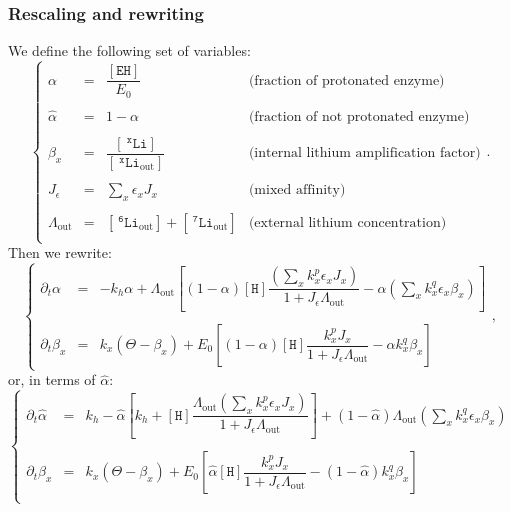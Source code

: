 \documentclass[aps,onecolumn,11pt]{revtex4}
\newcommand{\mychem}[1]{\mathtt{#1}}
\newcommand{\myconc}[1]{\left\lbrack{#1}\right\rbrack}
\newcommand{\spLi}[1]{{~^{\mychem{#1}}\mychem{Li}}}
\newcommand{\Li}[1]{\myconc{\spLi{#1}}}
\newcommand{\spLiOut}[1]{{\spLi{#1}}_{\mathrm{out}}}
\newcommand{\LiOut}[1]{\myconc{\spLiOut{#1}}}
\newcommand{\spEHin}{\mychem{EH}}
\newcommand{\EHin}{\myconc{\spEHin}}
\newcommand{\spproton}{\mychem{H}}
\newcommand{\proton}{\myconc{\spproton}}
\newcommand{\LiAll}{\Lambda}
\newcommand{\LiAllOut}{{\LiAll}_{\mathrm{out}}}
\begin{document}
\subsubsection{Rescaling and rewriting}
We define the following set of variables:
\begin{equation}
\label{eq:scale}
\left\lbrace
\begin{array}{rcll}
	\alpha & = & \dfrac{\EHin}{E_0} & \text{(fraction of protonated enzyme)}\\
	\\
	\hat\alpha & = & 1-\alpha       & \text{(fraction of not protonated enzyme)}\\
	\\
	\beta_x    & = & \dfrac{\Li{x}}{\LiOut{x}} & \text{(internal lithium amplification factor)}\\
	\\
	J_\epsilon & = & \sum_x \epsilon_x J_x & \text{(mixed affinity)}\\
	\\
	\LiAllOut  & = & \LiOut{6} + \LiOut{7} & \text{(external lithium concentration)}\\
\end{array}
\right..
\end{equation}
Then we rewrite:
\begin{equation}
\label{eq:sysnew}
\left\lbrace
\begin{array}{rcl}
	\partial_t \alpha & = & -k_h \alpha + \LiAllOut \left[ (1-\alpha) \proton  \dfrac{ \left(\sum_x k^p_x \epsilon_x J_x\right) }{1+J_\epsilon\LiAllOut}
	-\alpha  \left(\sum_x k^q_x \epsilon_x \beta_x \right)\right]
	\\
	\\
	\partial_t \beta_x & = & k_x\left(\Theta - \beta_x\right) +E_0\left[ (1-\alpha)  \proton \dfrac{k^p_x J_x}{1+J_\epsilon \LiAllOut} - \alpha k^q_x \beta_x \right]
\end{array}
\right.,
\end{equation}
or, in terms of $\hat\alpha$:
\begin{equation}
\label{eq:sysbis}
\left\lbrace
\begin{array}{rcl}
	\partial_t \hat\alpha & = & k_h  
		- \hat\alpha\left\lbrack k_h+ \proton  \dfrac{ \LiAllOut \left(\sum_x k^p_x \epsilon_x J_x\right) }{1+J_\epsilon\LiAllOut}\right] 
		+ (1-\hat\alpha) \LiAllOut\left( {\sum_x k_x^q \epsilon_x \beta_x} \right)
	\\
	\\
	\partial_t \beta_x & = & k_x\left(\Theta - \beta_x\right) +E_0\left[ \hat\alpha  \proton \dfrac{k^p_x J_x}{1+J_\epsilon \LiAllOut} - (1-\hat\alpha) k^q_x \beta_x \right]\\
\end{array}
\right.
\end{equation}
\end{document}
